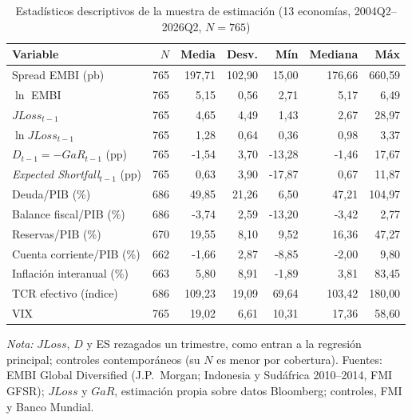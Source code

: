 \begin{table}[htbp]
\centering
\small
\caption{Estadísticos descriptivos de la muestra de estimación (13 economías, 2004Q2--2026Q2, $N=765$)}
\label{tab:descriptivos}
\begin{tabular}{lrrrrrr}
\toprule
Variable & $N$ & Media & Desv. & Mín & Mediana & Máx \\
\midrule
Spread EMBI (pb) & 765 & 197{,}71 & 102{,}90 & 15{,}00 & 176{,}66 & 660{,}59 \\
$\ln$ EMBI & 765 & 5{,}15 & 0{,}56 & 2{,}71 & 5{,}17 & 6{,}49 \\
$JLoss_{t-1}$ & 765 & 4{,}65 & 4{,}49 & 1{,}43 & 2{,}67 & 28{,}97 \\
$\ln JLoss_{t-1}$ & 765 & 1{,}28 & 0{,}64 & 0{,}36 & 0{,}98 & 3{,}37 \\
$D_{t-1}=-GaR_{t-1}$ (pp) & 765 & -1{,}54 & 3{,}70 & -13{,}28 & -1{,}46 & 17{,}67 \\
\textit{Expected Shortfall}$_{t-1}$ (pp) & 765 & 0{,}63 & 3{,}90 & -17{,}87 & 0{,}67 & 11{,}87 \\
Deuda/PIB (\%) & 686 & 49{,}85 & 21{,}26 & 6{,}50 & 47{,}21 & 104{,}97 \\
Balance fiscal/PIB (\%) & 686 & -3{,}74 & 2{,}59 & -13{,}20 & -3{,}42 & 2{,}77 \\
Reservas/PIB (\%) & 670 & 19{,}55 & 8{,}10 & 9{,}52 & 16{,}36 & 47{,}27 \\
Cuenta corriente/PIB (\%) & 662 & -1{,}66 & 2{,}87 & -8{,}85 & -2{,}00 & 9{,}80 \\
Inflación interanual (\%) & 663 & 5{,}80 & 8{,}91 & -1{,}89 & 3{,}81 & 83{,}45 \\
TCR efectivo (índice) & 686 & 109{,}23 & 19{,}09 & 69{,}64 & 103{,}42 & 180{,}00 \\
VIX & 765 & 19{,}02 & 6{,}61 & 10{,}31 & 17{,}36 & 58{,}60 \\
\bottomrule
\end{tabular}
\par\smallskip\parbox{0.92\linewidth}{\footnotesize \textit{Nota:} $JLoss$, $D$ y ES rezagados un trimestre, como entran a la regresión principal; controles contemporáneos (su $N$ es menor por cobertura). Fuentes: EMBI Global Diversified (J.P.\ Morgan; Indonesia y Sudáfrica 2010--2014, FMI GFSR); $JLoss$ y $GaR$, estimación propia sobre datos Bloomberg; controles, FMI y Banco Mundial.}
\end{table}

